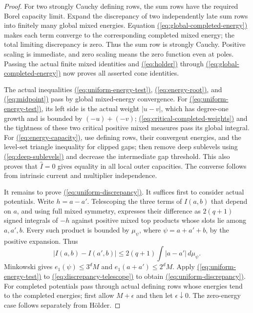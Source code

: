 \documentclass[11pt,reqno]{amsart}
\theoremstyle{definition}
\theoremstyle{remark}
\numberwithin{equation}{section}
\newcommand{\MathEqref}[1]{\begingroup\hypersetup{linkcolor=EquationLink}\hyperref[#1]{(\ref*{#1})}\endgroup}
\begin{document}
\begin{proof}
For two strongly Cauchy defining rows, the sum rows have the
required Borel capacity limit. Expand the discrepancy of two
independently late sum rows into finitely many global mixed
energies. Equation \MathEqref{eq:global-completed-energy} makes each term converge to the
corresponding completed mixed energy; the total limiting
discrepancy is zero. Thus the sum row is strongly Cauchy.
Positive scaling is immediate, and zero scaling means the
zero function even at poles. Passing the actual finite mixed
identities and \MathEqref{eq:holder} through \MathEqref{eq:global-completed-energy} now proves all asserted
cone identities.

The actual inequalities \MathEqref{eq:uniform-energy-test}, \MathEqref{eq:energy-root}, and \MathEqref{eq:midpoint} pass by
global mixed-energy convergence. For \MathEqref{eq:uniform-energy-test}, its left side is
the actual weight $|u-v|$, which has degree-one growth and is
bounded by $(-u)+(-v)$; \MathEqref{eq:critical-completed-weights} and the tightness of these two
critical positive mixed measures pass its global integral.
For \MathEqref{eq:energy-capacity}, use defining rows, their convergent energies,
and the level-set triangle inequality for clipped gaps;
then remove deep sublevels using \MathEqref{eq:deep-sublevels} and decrease the
intermediate gap threshold. This also proves that
$\widehat I=0$ gives equality in all local outer capacities.
The converse follows from intrinsic current and multiplier
independence.

It remains to prove \MathEqref{eq:uniform-discrepancy}. It suffices first to consider
actual potentials. Write $h=a-a'$. Telescoping the three
terms of $I(a,b)$ that depend on $a$, and using full mixed
symmetry, expresses their difference as $2(q+1)$ signed
integrals of $-h$ against positive mixed top products whose
slots lie among $a,a',b$. Every such product is bounded by
$\mu_\psi$, where $\psi=a+a'+b$, by the positive expansion.
Thus
\begin{equation}\label{eq:discrepancy-telescope}
 |I(a,b)-I(a',b)|
                  \leq2(q+1)\int|a-a'|\,d\mu_\psi.
\end{equation}
Minkowski gives $e_1(\psi)\leq3^dM$ and
$e_1(a+a')\leq2^dM$. Apply \MathEqref{eq:uniform-energy-test} to \MathEqref{eq:discrepancy-telescope} to obtain
\MathEqref{eq:uniform-discrepancy}. For completed potentials pass through actual
defining rows whose energies tend to the completed energies;
first allow $M+\epsilon$ and then let $\epsilon\downarrow0$.
The zero-energy case follows separately from H\"older.
\end{proof}
\end{document}
